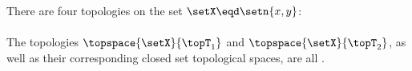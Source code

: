 \begin{example}
\label{ex:top_xy}
\label{ex:top_closed_xy}
There are four topologies on the set $\setX\eqd\setn{x,y}$:
\\
  \\
  The topologies $\topspace{\setX}{\topT_1}$ and $\topspace{\setX}{\topT_2}$, as well as their corresponding closed set topological spaces,
  are all .
\end{example}



